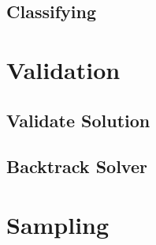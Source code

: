 \subsection{Classifying}


\section{Validation}

\subsection{Validate Solution}

\subsection{Backtrack Solver}


\section{Sampling}





